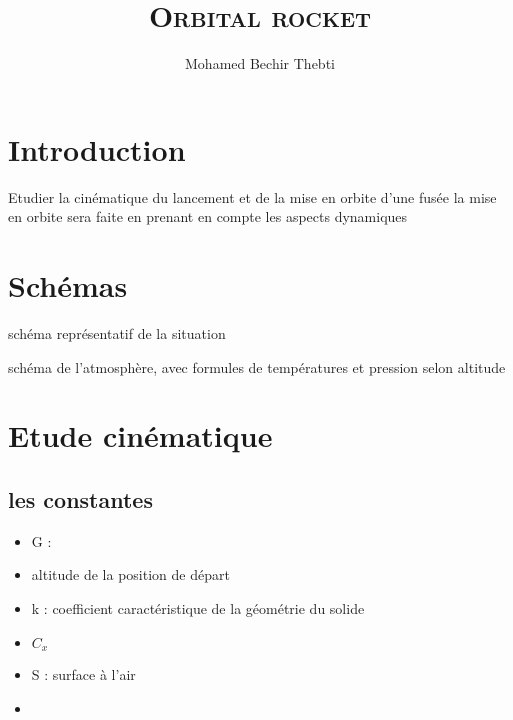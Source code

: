 \documentclass[12pt,a4paper]{article}
\title{
	\Huge\textsc{Orbital rocket}
}
\author{Mohamed Bechir Thebti}
\begin{document}
\setlength{\parindent}{0mm}

\fancyhead[R]{\slshape \leftmark}

\fancyfoot[C]{}
\fancyfoot[R]{\thepage}

\maketitle
\newpage

\tableofcontents

\newpage



\section{Introduction}

Etudier la cinématique du lancement et de la mise en orbite d'une fusée
\medbreak
la mise en orbite sera faite en prenant en compte les aspects dynamiques


\newpage
\section{Schémas}
schéma représentatif de la situation

schéma de l'atmosphère, avec formules de températures et pression selon altitude

\section{Etude cinématique}


\subsection{les constantes}

\begin{itemize}
	\item G : 
	\item altitude de la position de départ
	\item k : coefficient caractéristique de la géométrie du solide
	\item $C_x$
	\item S : surface à l'air
	\item 
\end{itemize}
\end{document}
